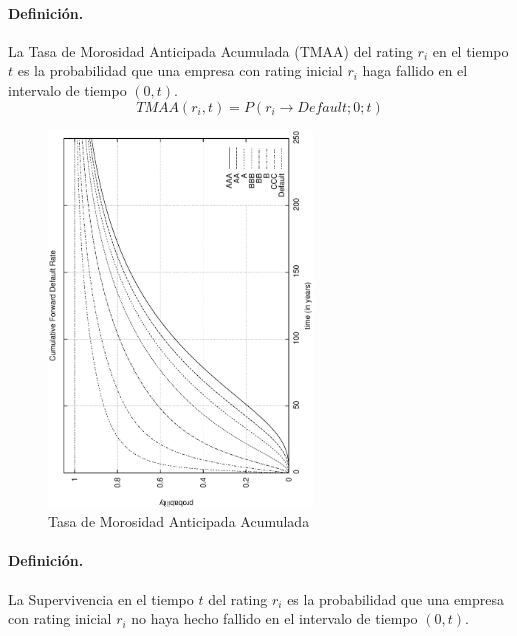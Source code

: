 \paragraph{Definici\'on.} La Tasa de Morosidad Anticipada Acumulada (TMAA) 
del rating $r_i$ en el tiempo $t$ es la probabilidad que una empresa con rating 
inicial $r_i$ haga fallido en el intervalo de tiempo $(0,t)$.
\begin{displaymath}
TMAA(r_i,t)=P(r_i \to Default;0;t)
\end{displaymath}

\begin{figure}[!hb]
\begin{center}
\includegraphics[height=10cm, angle=-90]{./images/tmaa.ps}
\caption{Tasa de Morosidad Anticipada Acumulada}
\label{tmaa}
\end{center}
\end{figure}

\paragraph{Definici\'on.} La Supervivencia en el tiempo $t$ del rating $r_i$ 
es la probabilidad que una empresa con rating inicial $r_i$ no haya hecho 
fallido en el intervalo de tiempo $(0,t)$.

